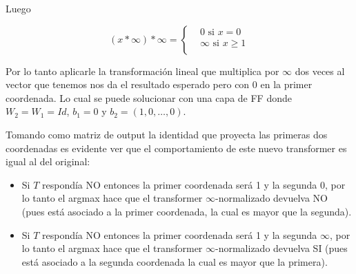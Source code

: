Luego 

\[(x *\infty) *\infty= \begin{cases}
    &0 \text{ si } x = 0 \\
    &\infty \text{ si } x \ge 1 \\
\end{cases}\]

Por lo tanto aplicarle la transformación lineal que multiplica por $\infty$ dos veces al vector que tenemos nos da el resultado esperado pero con 0 en la primer coordenada. Lo cual se puede solucionar con una capa de FF donde $W_2 = W_1 = Id$, $b_1 = 0$ y $b_2 = (1,0,\dots,0)$.


Tomando como matriz de output la identidad que proyecta las primeras dos coordenadas es evidente ver que el comportamiento de este nuevo transformer es igual al del original: 
\begin{itemize}
    \item Si $T$ respondía NO entonces la primer coordenada será 1 y la segunda 0, por lo tanto el argmax hace que el transformer $\infty$-normalizado devuelva NO (pues está asociado a la primer coordenada, la cual es mayor que la segunda).
    \item Si $T$ respondía NO entonces la primer coordenada será 1 y la segunda $\infty$, por lo tanto el argmax hace que el transformer $\infty$-normalizado devuelva SI (pues está asociado a la segunda coordenada la cual es mayor que la primera).
\end{itemize}

